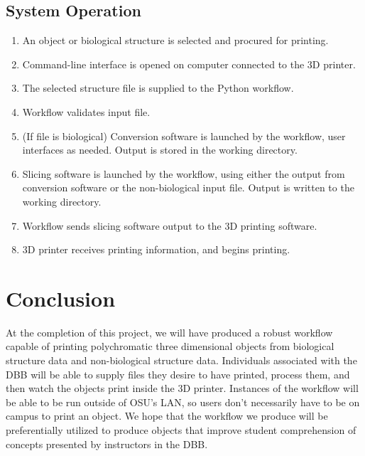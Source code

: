 \documentclass[letterpaper, onecolumn, draftclsnofoot, 10pt, compsoc]{IEEEtran}
\begin{document}
\begin{singlespace}
	\subsection{System Operation}
		\begin{enumerate}
    		\item An object or biological structure is selected and procured for printing.
            \item Command-line interface is opened on computer connected to the 3D printer.
            \item The selected structure file is supplied to the Python workflow.
            \item Workflow validates input file.
            \item (If file is biological) Conversion software is launched by the workflow, user interfaces as needed. Output is stored in the working directory.
            \item Slicing software is launched by the workflow, using either the output from conversion software or the non-biological input file. Output is written to the working directory.
            \item Workflow sends slicing software output to the 3D printing software.
            \item 3D printer receives printing information, and begins printing.
		\end{enumerate}
        
\section{Conclusion}
At the completion of this project, we will have produced a robust workflow capable of printing polychromatic three dimensional objects from biological structure data and non-biological structure data.
Individuals associated with the DBB will be able to supply files they desire to have printed, process them, and then watch the objects print inside the 3D printer. 
Instances of the workflow will be able to be run outside of OSU's LAN, so users don't necessarily have to be on campus to print an object.
We hope that the workflow we produce will be preferentially utilized to produce objects that improve student comprehension of concepts presented by instructors in the DBB.
\end{singlespace}

\newpage


\end{document}
